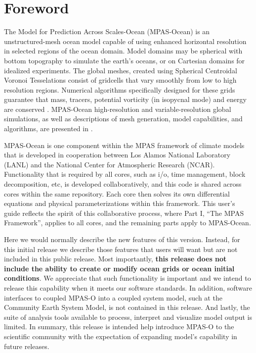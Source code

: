 \chapter*{Foreword}
\label{chap:foreword}
The Model for Prediction Across Scales-Ocean (MPAS-Ocean) is an unstructured-mesh ocean model capable of using enhanced horizontal resolution in selected regions of the ocean domain.  Model domains may be spherical with bottom topography to simulate the earth's oceans, or on Cartesian domains for idealized experiments.  The global meshes, created using Spherical Centroidal Voronoi Tesselations \citep{Ringler_ea08od,Ringler_ea11mwr} consist of gridcells that vary smoothly from low to high resolution regions. Numerical algorithms specifically designed for these grids guarantee that mass, tracers, potential vorticity (in isopycnal mode) and energy are conserved \citep{Thurburn_ea09jcp,Ringler_ea10jcp}.  MPAS-Ocean high-resolution and variable-resolution global simulations, as well as descriptions of mesh generation, model capabilities, and algorithms, are presented in \citet{Ringler_ea13om}.

MPAS-Ocean is one component within the MPAS framework of climate models that is developed in cooperation between Los Alamos National Laboratory (LANL) and the National Center for Atmospheric Research (NCAR).  Functionality that is required by all cores, such as i/o, time management, block decomposition, etc, is developed collaboratively, and this code is shared across cores within the same repository.  Each core then solves its own differential equations and physical parameterizations within this framework.  This user's guide reflects the spirit of this collaborative process, where Part I, ``The MPAS Framework'', applies to all cores, and the remaining parts apply to MPAS-Ocean.

Here we would normally describe the new features of this version.  Instead, for this initial release we describe those features that users will want but are not included in this public release. Most importantly, {\bf this release does not include the ability to create or modify ocean grids or ocean initial conditions}. We appreciate that such functionality is important and we intend to release this capability when it meets our software standards. In addition, software interfaces to coupled MPAS-O into a coupled system model, such at the Community Earth System Model, is not contained in this release. And lastly, the suite of analysis tools available to process, interpret and visualize model output is limited. In summary, this release is intended help introduce MPAS-O to the scientific community with the expectation of expanding model's capability in future releases.

